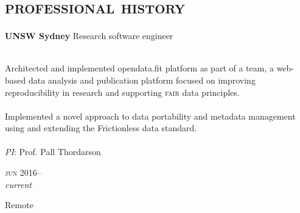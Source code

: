 
\vspace{-0.6cm}
\section*{\textsc{professional history}}
\vspace{-0.2cm}


\begin{minipage}[t]{\mainboxwidth\textwidth}
\textbf{UNSW Sydney}\phantom{..} Research software engineer\\
{\small
\\
Architected and implemented opendata.fit platform as part of a team, a web-based data analysis and publication platform focused on improving reproducibility in research and supporting \textsc{fair} data principles.\\
\\
Implemented a novel approach to data portability and metadata management using and extending the Frictionless data standard.\\
\\
\textit{PI}: Prof. Pall Thordarson\\

\par}
\end{minipage}
\begin{minipage}[t]{\detailboxwidth\textwidth}
{
\hfill \textsc{jun} 2016--\\ 
\hspace*{0pt} \hfill \textit{current}
\par
{\small\hfill Remote}
}
\end{minipage}
\\


